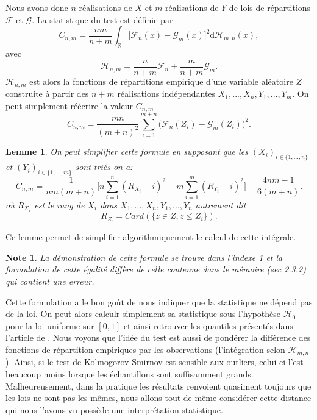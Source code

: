 \documentclass[a4paper,11pt]{article}
\numberwithin{equation}{section}
\newtheorem{lemma}{Lemme}
\newtheorem{note}{Note}
\begin{document}
Nous avons donc $n$ réalisations de $X$ et $m$ réalisations de $Y$ de lois de répartitions $\mathcal{F}$ et $\mathcal{G}$.
La statistique du test est définie par
\begin{equation}
	C_{n,m}=\frac{nm}{n+m}\int_{\mathbb{R}}\big[ \mathcal{F}_{n}(x)-\mathcal{G}_{m}(x)\big]^{2} \mathrm{d} \mathcal{H}_{m,n}(x),
\end{equation}
avec
\begin{equation}
	\mathcal{H}_{n,m}=\frac{n}{n+m}\mathcal{F}_n+\frac{m}{n+m}\mathcal{G}_m.
\end{equation}
$\mathcal{H}_{n,m}$ est alors la fonctions de répartitions empirique d'une variable aléatoire $Z$ construite à partir des $n+m$ réalisations indépendantes $X_1,...,X_n,Y_1,...,Y_m$. On peut simplement réécrire la valeur $C_{n,m}$
\begin{equation}
	C_{n,m}=\frac{mn}{(m+n)^2}\sum_{i=1}^{m+n}\big(\mathcal{F}_n(Z_i)-\mathcal{G}_{m}(Z_i)\big)^2.
\end{equation}

\begin{lemma}
	\label{C-v}
	On peut simplifier cette formule en supposant que les $(X_i)_{i\in \{1,...,n\}}$ et $(Y_i)_{i\in \{1,...,m\}}$ sont triés on a:
	\begin{equation}
		C_{n,m}=\frac{1}{nm(m+n)}\Big[ n\sum_{i=1}^{n}(R_{X_i}-i)^2+ m\sum_{i=1}^{m}(R_{Y_i}-i)^2\Big]-\frac{4nm-1}{6(m+n)}.
	\end{equation}
	où $R_{X_i}$ est le rang de $X_i$ dans $X_1,...,X_n,Y_1,...,Y_n$ autrement dit 
	\[R_{Z_i}=Card(\{z\in Z, z\leq Z_i\}).\] 
\end{lemma}
Ce lemme permet de simplifier algorithmiquement le calcul de cette intégrale.
\begin{note}
	La démonstration de cette formule se trouve dans l'indexe \ref{C-v} et la formulation de cette égalité diffère de celle contenue dans le mémoire \cite{ethier2011propos}(sec 2.3.2) qui contient une erreur.
\end{note}
Cette formulation a le bon goût de nous indiquer que la statistique ne dépend pas de la loi. On peut alors calculr simplement sa statistique sous l'hypothèse $\mathcal{H}_0$ pour la loi uniforme sur $[0,1]$ et ainsi retrouver les quantiles présentés dans l'article de \cite{buning2002robustness}. Nous voyons que l'idée du test est aussi de pondérer la différence des fonctions de répartition empiriques par les observations (l'intégration selon $\mathcal{H}_{m,n}$). Ainsi, si le test de Kolmogorov-Smirnov est sensible aux outliers, celui-ci l’est beaucoup moins lorsque les échantillons sont suffisamment grands. Malheureusement, dans la pratique les résultats renvoient quasiment toujours que les lois ne sont pas les mêmes, nous allons tout de même considérer cette distance qui nous l'avons vu possède une interprétation statistique.  
\end{document}
